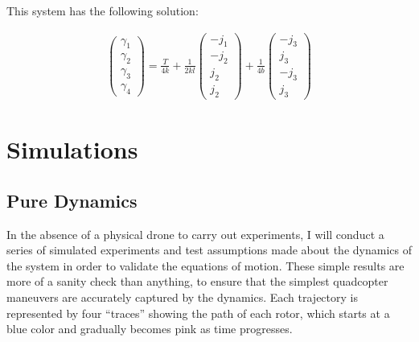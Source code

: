 \documentclass{article}
\begin{document}
This system has the following solution:

\begin{align}
    \begin{pmatrix} \gamma_1 \\ \gamma_2 \\ \gamma_3 \\ \gamma_4 \end{pmatrix} =
    \frac{T}{4k} + 
    \frac{1}{2 k l}
    \begin{pmatrix} -j_1 \\ -j_2 \\ j_2 \\ j_2 \end{pmatrix} +
    \frac{1}{4 b}
    \begin{pmatrix} -j_3 \\ j_3 \\ -j_3 \\ j_3 \end{pmatrix}
\end{align}

\newpage
\section{Simulations}

\subsection{Pure Dynamics}

\newcommand{\traj}[3]{
    \begin{figure}[H]
        \centering
        \begin{minipage}{0.65\textwidth}
            \centering
            \texttt{[image: figures/\#1/traj3d.png]}
        \end{minipage}
        \begin{minipage}{0.85\textwidth}
            \centering
            \texttt{[image: figures/\#1/traj2d.png]}
        \end{minipage}
        \caption{#2}
        \label{#3}
    \end{figure}}

In the absence of a physical drone to carry out experiments, I will conduct a series of simulated experiments and test assumptions made about the dynamics of the system in order to validate the equations of motion. These simple results are more of a sanity check than anything, to ensure that the simplest quadcopter maneuvers are accurately captured by the dynamics. Each trajectory is represented by four ``traces'' showing the path of each rotor, which starts at a blue color and gradually becomes pink as time progresses.
\end{document}
